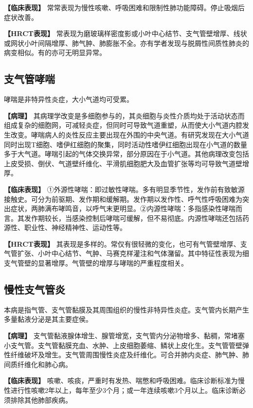 \textbf{【临床表现】}
常常表现为慢性咳嗽、呼吸困难和限制性肺功能障碍。停止吸烟后症状改善。

\textbf{【HRCT表现】}
常表现为磨玻璃样密度影或小叶中心结节、支气管壁增厚、线状或网状小叶间隔增厚、肺气肿、肺膨胀不全。亦有学者发现与脱屑性间质性肺炎的病变相似。有的亦可无明显异常。

\subsection{支气管哮喘}

哮喘是非特异性炎症，大小气道均可受累。

\textbf{【病理】}
其病理学改变是多细胞参与的，其炎细胞与炎性介质均处于活动状态而组成复杂的细胞网，可减轻炎症，但同时可导致气道重塑，从而使大小气道内腔发生改变。哮喘病人的炎性反应主要出现在外围的中央气道。有研究发现在大小气道同时出现T细胞、嗜伊红细胞的聚集，同时活动性嗜伊红细胞出现在小气道的数量多于大气道。哮喘引起的气体交换异常，部分原因在于小气道。其他病理改变包括上皮受损、倒伏、气道壁纤维化、平滑肌细胞肥大及血管扩张等均可导致气道壁增厚。

\textbf{【临床表现】}
①外源性哮喘：即过敏性哮喘。多有明显季节性，发作前有致敏源接触史。可分为前驱期、发作期和缓解期。发作期以发作性、呼气性呼吸困难为突出症状，两肺满布哮鸣音，以呼气末更明显。②内源性哮喘：多指感染性哮喘而言。其发作期较长，当感染控制后哮喘可缓解，但不易彻底。内源性哮喘还包括药源性、职业性、神经精神性、运动性等。

\textbf{【HRCT表现】}
其表现是多样的。常仅有很轻微的变化，也可有气管壁增厚、支气管扩张、小叶中心结节、气肿、马赛克样灌注和气体潴留。其中特征性表现为细支气管壁的显著增厚。气管壁的增厚与哮喘的严重程度相关。

\subsection{慢性支气管炎}

本病是指气管、支气管黏膜及其周围组织的慢性非特异性炎症。支气管内长期产生多量黏液分泌是其主要症侯。

\textbf{【病理】}
支气管黏液腺体增生、腺管增宽，支气管内分泌物增多、黏稠，常堵塞小支气管。支气管黏膜充血、水肿、上皮细胞萎缩、鳞状上皮化生。支气管管壁弹性纤维破坏及增生。支气管周围慢性炎症及纤维化。可合并肺内炎症、肺气肿、肺间质纤维化和肺心病。

\textbf{【临床表现】}
咳嗽、咳痰，严重时有发热、喘憋和呼吸困难。临床诊断标准为慢性进行性咳嗽2年以上，每年至少3个月；或一年连续咳嗽3个月以上。临床诊断必须排除其他肺部疾病。

